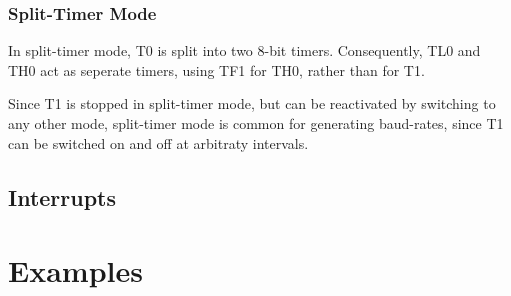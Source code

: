 \documentclass[journal]{IEEEtran}
\begin{document}
{\subsubsection{Split-Timer Mode}
In split-timer mode, T0 is split into two 8-bit timers. Consequently, TL0
and TH0 act as seperate timers, using TF1 for TH0, rather than for T1.

Since T1 is stopped in split-timer mode, but can be reactivated by switching
to any other mode, split-timer mode is common for generating baud-rates, since
T1 can be switched on and off at arbitraty intervals.

\subsection{Interrupts}


\pagebreak
\section{Examples}
} %
\end{document}
